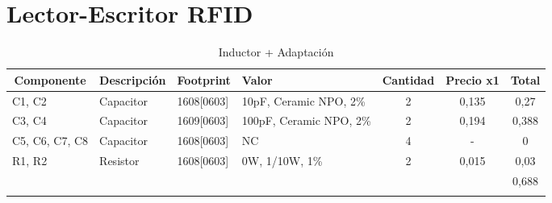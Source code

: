 \section{Lector-Escritor RFID}
\begin{longtable}{|l|p{2cm}|p{2cm}|p{2.5cm}|c|c|c|}
\hline
\multicolumn{1}{|c|}{\textbf{Componente}} & \multicolumn{1}{c|}{\textbf{Descripción}} & \textbf{ Footprint} & \textbf{Valor} & \textbf{Cantidad} & \textbf{Precio x1} & \textbf{Total} \\ \hline
C1, C2 & Capacitor & 1608[0603] & 10pF,   Ceramic NPO, 2\% & 2 & 0,135 & 0,27 \\ \hline
C3, C4 & Capacitor & 1609[0603] & 100pF, Ceramic NPO, 2\% & 2 & 0,194 & 0,388 \\ \hline
C5, C6, C7, C8 & Capacitor & 1608[0603] &  NC & 4 & - & 0 \\ \hline
R1,  R2 & Resistor & 1608[0603] & 0W,  1/10W,  1\% & 2 & 0,015 & 0,03 \\ \hline
 &  &  &  &  &  & 0,688 \\ \hline
\caption{Inductor + Adaptaci\'on}
\label{}
\end{longtable}



